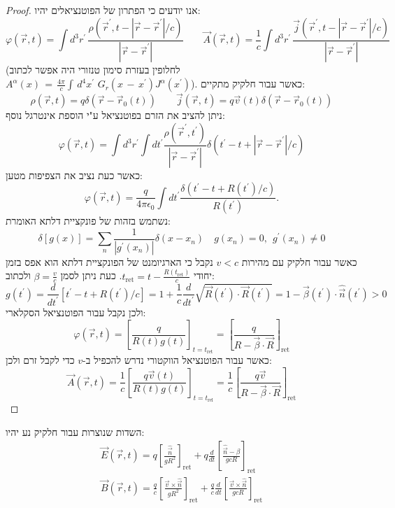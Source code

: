 \documentclass{tstextbook}
\begin{document}
\begin{proof}
אנו יודעים כי הפתרון של הפוטנציאלים יהיו:
$$\varphi\left( \vec{r},t \right)=\int d^{3}r^{\prime}\,{\frac{\rho\left( \vec{r}^{\prime},t-|\vec{r}-\vec{r}^{\prime}|/c \right)}{|\vec{r}-\vec{r}^{\prime}|}}\qquad \vec{A}(\vec{r},t)={\frac{1}{c}}\int d^{3}r^{\prime}\,{\frac{{\vec{j}(\vec{r}^{\prime},t-|\vec{r}-\vec{r}^{\prime}|/c)}}{|\vec{r}-\vec{r}^{\prime}|}}$$
(לחלופין בעזרת סימון טנזורי היה אפשר לכתוב \({ A}^{\alpha}(x)\,=\,\frac{4\pi}{c}\int\,d^{4}x^{\prime}\,\,G_{r}(x\,-\,x^{\prime})J^{\alpha}(x^{\prime})\)). כאשר עבור חלקיק מתקיים:
$$\rho\left( {\vec r},t \right)=q\delta\left( {\vec r}-{\vec r}_{0}(t) \right)\qquad {\vec j}({\vec r},\,t)=q{\vec v}(t)\delta({\vec r}-{\vec r}_{0}(t))$$
ניתן להציב את הזרם בפוטנציאל ע"י הוספת אינטרגל נוסף:
$$\varphi(\vec{r},t)={ }\int d^{3}r^{\prime}\int d t^{\prime}{\frac{\rho(\vec{r}^{\prime},t^{\prime})}{|\vec{r}-\vec{r}^{\prime}|}}\delta(t^{\prime}-t+|\vec{r}-\vec{r}^{\prime}|/c)$$
כאשר כעת נציב את הצפיפות מטען:
$$\varphi({\vec r},t)=\frac{q}{4\pi\epsilon_{0}}\int d t^{\prime}\frac{\delta(t^{\prime}-t+R(t^{\prime})/c)}{R(t^{\prime})}.$$
נשתמש בזהות של פונקציית דלתא האומרת:
$$\delta[g(x)]=\sum_{n}\frac{1}{|g^{\prime}(x_{n})|}\delta(x-x_{n})\quad g(x_{n})=0,\ \ g^{\prime}(x_{n})\ne0$$
כאשר עבור חלקיק עם מהירות \(v<c\) נקבל כי הארגיומנט של הפונקציית דלתא הוא אפס בזמן יחודי \(t_{\mathrm{ret}}=t-{\frac{R(t_{\mathrm{ret}})}{c}}\). כעת ניתן לסמן \(\beta=\frac{v}  {c}\) ולכתוב:
$$g(t^{\prime})={\frac{d}{d t^{\prime}}}\left[t^{\prime}-t+R(t^{\prime})/c\right]=1+{\frac{1}{c}}{\frac{d}{d t^{\prime}}}{\sqrt{\vec{R}(t^{\prime})\cdot\vec{R}(t^{\prime})}}=1-{\vec{\beta}}(t^{\prime})\cdot{\hat{\vec{n}}}(t^{\prime})>0$$
ולכן נקבל עבור הפוטנציאל הסקלארי:
$$\varphi(\vec{r},t)={ }\left[{\frac{q}{R(t)g(t)}}\right]_{t=t_{\mathrm{ret}}}={ }\left[{\frac{q}{R-{\vec{\beta}}\cdot\vec{R}}}\right]_{\mathrm{ret}}$$
כאשר עבור הפוטנציאל הווקטורי נדרש להכפיל ב-\(v\) כדי לקבל זרם ולכן:
$$\vec{A}(\vec{r},t)={ \frac{1}{c}}\left[{\frac{q\vec{v}(t)}{R(t)g(t)}}\right]_{t=t_{\mathrm{rel}}}={ \frac{1}{c}}\left[{\frac{q\vec{v}}{R-{\vec{\beta}}\cdot\vec{R}}}\right]_{\mathrm{ret}}$$

\end{proof}
\begin{proposition}
השדות שנוצרות עבור חלקיק נע יהיו:
$$\begin{gather}\vec{E}(\vec{r},t)=q\left[{\frac{\hat{\vec{n}}}{g R^{2}}}\right]_{\mathrm{ret}}+q{\frac{d}{d t}}\left[{\frac{\hat{\vec{n}}-\beta}{g c R}}\right]_{\mathrm{ret}} \\\vec{B}(\vec{r},t)={\frac{q}{c}}\left[{\frac{\vec{v}\times{\hat{\vec{n}}}}{g R^{2}}}\right]_{\mathrm{ret}}+{\frac{q}{c}}{\frac{d}{d t}}\left[{\frac{\vec{v}\times{\hat{\vec{n}}}}{g c R}}\right]_{\mathrm{ret}}
\end{gather}$$

\end{proposition}
\end{document}
